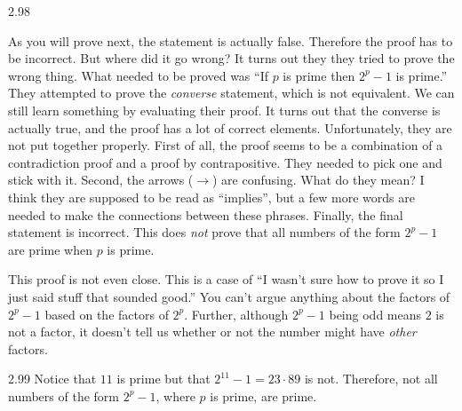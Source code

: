 \begin{Answer}{2.98}
\begin{pfevalenum}
\item
As you will prove next, the statement is actually false.
Therefore the proof has to be incorrect.
But where did it go wrong?
It turns out they they tried to prove the wrong thing.  What needed to be proved was
``If $p$ is prime then $2^p-1$ is prime.''  They attempted to prove the {\em converse}
statement, which is not equivalent.
We can still learn something by evaluating their proof.
It turns out that the converse is actually true,
and the proof has a lot of correct elements.  Unfortunately, they are not put together
properly.   First of all, the proof seems to be a combination of a contradiction proof
and a proof by contrapositive.  They needed to pick one and stick with it.
Second, the arrows ($\rightarrow$) are confusing.  What do they mean?
I think they are supposed to be read as ``implies'', but a few more words are needed to
make the connections between these phrases.
Finally, the final statement is incorrect.  This does {\em not} prove that all
numbers of the form $2^p-1$ are prime when $p$ is prime.
\item
This proof is not even close.
This is a case of ``I wasn't sure how to prove it so I just said stuff that sounded good.''
You can't argue anything about the factors of
$2^p-1$ based on the factors of $2^p$.  Further, although $2^p-1$ being odd means
$2$ is not a factor, it doesn't tell us whether or not the number might have
{\em other} factors.
\end{pfevalenum}
\end{Answer}
\begin{Answer}{2.99}
Notice that $11$ is prime but that $2^{11}-1=23\cdot 89$ is not.
Therefore, not all numbers of the form $2^p-1$, where $p$ is prime, are prime.
\end{Answer}
